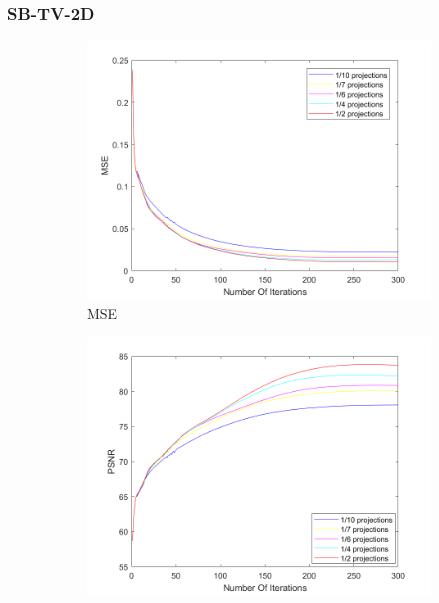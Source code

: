 \subsubsection{SB-TV-2D}
\begin{figure}[ht!]
		
       		\centering
      		\begin{subfigure}[b]{0.475\textwidth}
            	\centering
            	\includegraphics[width=\textwidth]{../../data/res/SB_Reconstruction/Errors/Err_MSE_2D_AllProj_Target1.png}
            	\caption{MSE}    
            	\label{subfig:Target1Fully}
        	\end{subfigure}
        	\hfill
        	\begin{subfigure}[b]{0.475\textwidth}  
            	\centering 
            	\includegraphics[width=\textwidth]{../../data/res/SB_Reconstruction/Errors/Err_PSNR_2D_AllProj_Target1.png}

\end{subfigure}
\end{figure}

